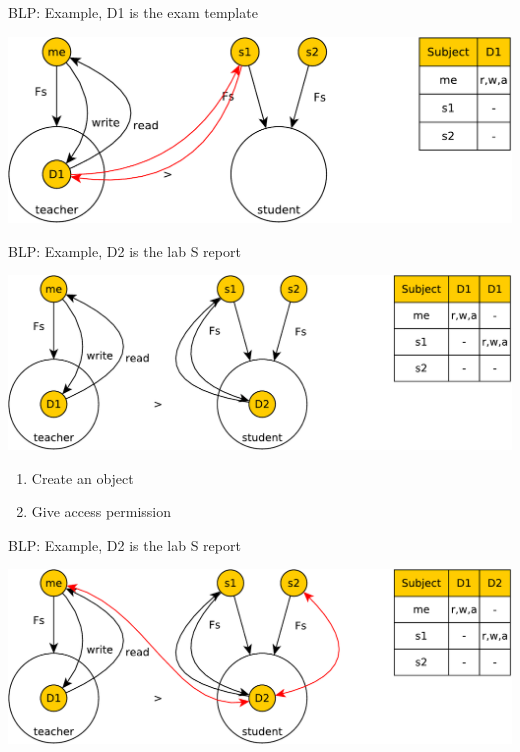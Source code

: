 \documentclass{beamer}
\begin{document}
\begin{frame}[t]{BLP: Example, D1 is the exam template}
  \begin{center}
    \includegraphics[width=0.8\linewidth]{ex5}
  \end{center}
\end{frame}
\begin{frame}[t]{BLP: Example, D2 is the lab S report}
  \begin{center}
    \includegraphics[width=0.9\linewidth]{ex6}
  \end{center}
\begin{enumerate}
  \item Create an object
  \item Give access permission
\end{enumerate}
\end{frame}
\begin{frame}[t]{BLP: Example, D2 is the lab S report}
  \begin{center}
    \includegraphics[width=0.9\linewidth]{ex7}
  \end{center}
\end{frame}
\end{document}
